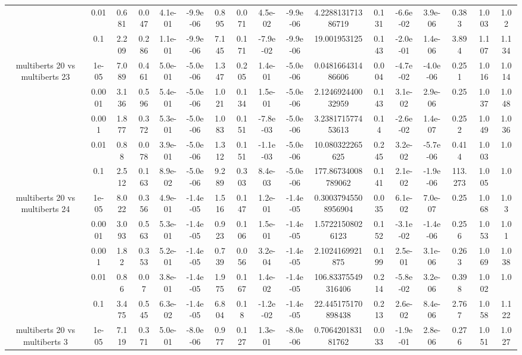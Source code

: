 \begin{tabular}{|c|c|c|c|c|c|c|c|c|c|c|c|c|c|c|c|c|}
 & 0.01 & 0.681 & 0.047 & 4.1e-01 & -9.9e-06 & 0.895 & 0.071 & 4.5e-02 & -9.9e-06 & 4.228813171386719 & 0.131 & -6.6e-02 & 3.9e-06 & 0.383 & 1.003 & 1.02 \\
 & 0.1 & 2.209 & 0.286 & 1.1e-01 & -9.9e-06 & 7.145 & 0.171 & -7.9e-02 & -9.9e-06 & 19.001953125 & 0.143 & -2.0e-01 & 1.4e-06 & 3.894 & 1.107 & 1.134 \\
\hline
\multirow{5}{*}{multiberts 20 vs multiberts 23} & 1e-05 & 7.089 & 0.461 & 5.0e-01 & -5.0e-06 & 1.347 & 0.205 & 1.4e-01 & -5.0e-06 & 0.048166431486606 & 0.004 & -4.7e-02 & -4.0e-06 & 0.251 & 1.016 & 1.014 \\
 & 0.0001 & 3.136 & 0.596 & 5.4e-01 & -5.0e-06 & 1.021 & 0.134 & 1.5e-01 & -5.0e-06 & 2.124692440032959 & 0.143 & 3.1e-02 & 2.9e-06 & 0.25 & 1.037 & 1.048 \\
 & 0.001 & 1.877 & 0.372 & 5.3e-01 & -5.0e-06 & 1.083 & 0.151 & -7.8e-03 & -5.0e-06 & 3.238171577453613 & 0.14 & -2.6e-02 & 1.4e-07 & 0.252 & 1.049 & 1.036 \\
 & 0.01 & 0.88 & 0.078 & 3.9e-01 & -5.0e-06 & 1.312 & 0.151 & -1.1e-03 & -5.0e-06 & 10.080322265625 & 0.245 & 3.2e-02 & -5.7e-06 & 0.414 & 1.003 & 1.0 \\
 & 0.1 & 2.512 & 0.163 & 8.9e-02 & -5.0e-06 & 9.289 & 0.303 & 8.4e-03 & -5.0e-06 & 177.86734008789062 & 0.141 & 2.1e-02 & -1.9e-06 & 113.273 & 1.005 & 1.0 \\
\hline
\multirow{5}{*}{multiberts 20 vs multiberts 24} & 1e-05 & 8.022 & 0.356 & 4.9e-01 & -1.4e-05 & 1.516 & 0.147 & 1.2e-01 & -1.4e-05 & 0.30037945508956904 & 0.035 & 6.1e-02 & 7.0e-07 & 0.25 & 1.068 & 1.03 \\
 & 0.0001 & 3.093 & 0.563 & 5.3e-01 & -1.4e-05 & 0.923 & 0.106 & 1.5e-01 & -1.4e-05 & 1.57221508026123 & 0.152 & -3.1e-02 & -1.4e-06 & 0.256 & 1.053 & 1.01 \\
 & 0.001 & 1.82 & 0.353 & 5.2e-01 & -1.4e-05 & 0.739 & 0.056 & 3.2e-04 & -1.4e-05 & 2.1024169921875 & 0.199 & 2.5e-01 & 3.1e-06 & 0.263 & 1.069 & 1.038 \\
 & 0.01 & 0.86 & 0.07 & 3.8e-01 & -1.4e-05 & 1.975 & 0.167 & 1.4e-02 & -1.4e-05 & 106.83375549316406 & 0.214 & -5.8e-02 & 3.2e-06 & 0.398 & 1.002 & 1.0 \\
 & 0.1 & 3.475 & 0.545 & 6.3e-02 & -1.4e-05 & 6.804 & 0.18 & -1.2e-02 & -1.4e-05 & 22.445175170898438 & 0.213 & 2.6e-02 & 8.4e-06 & 2.767 & 1.058 & 1.122 \\
\hline
\multirow{5}{*}{multiberts 20 vs multiberts 3} & 1e-05 & 7.119 & 0.371 & 5.0e-01 & -8.0e-06 & 0.977 & 0.127 & 1.3e-01 & -8.0e-06 & 0.706420183181762 & 0.033 & -1.9e-01 & 2.8e-06 & 0.276 & 1.051 & 1.027 \\

\end{tabular}
